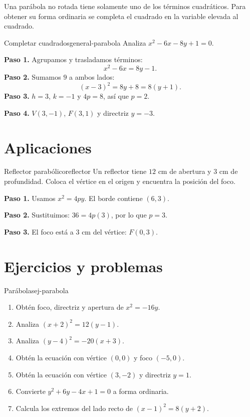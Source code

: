 Una parábola no rotada tiene solamente uno de los términos cuadráticos. Para
obtener su forma ordinaria se completa el cuadrado en la variable elevada al
cuadrado.

\begin{example}{Completar cuadrados}{general-parabola}
Analiza $x^2-6x-8y+1=0$.
\begin{solution}
\textbf{Paso 1.} Agrupamos y trasladamos términos:
\[
x^2-6x=8y-1.
\]
\textbf{Paso 2.} Sumamos $9$ a ambos lados:
\[
(x-3)^2=8y+8=8(y+1).
\]
\textbf{Paso 3.} $h=3$, $k=-1$ y $4p=8$, así que $p=2$.

\textbf{Paso 4.} $V(3,-1)$, $F(3,1)$ y directriz $y=-3$.
\end{solution}
\end{example}

\section{Aplicaciones}

\begin{example}{Reflector parabólico}{reflector}
Un reflector tiene $12$ cm de abertura y $3$ cm de profundidad. Coloca el
vértice en el origen y encuentra la posición del foco.
\begin{solution}
\textbf{Paso 1.} Usamos $x^2=4py$. El borde contiene $(6,3)$.

\textbf{Paso 2.} Sustituimos: $36=4p(3)$, por lo que $p=3$.

\textbf{Paso 3.} El foco está a $3$ cm del vértice: $F(0,3)$.
\end{solution}
\end{example}

\section{Ejercicios y problemas}

\begin{exercise}{Parábolas}{ej-parabola}
\begin{enumerate}
  \item Obtén foco, directriz y apertura de $x^2=-16y$.
  \item Analiza $(x+2)^2=12(y-1)$.
  \item Analiza $(y-4)^2=-20(x+3)$.
  \item Obtén la ecuación con vértice $(0,0)$ y foco $(-5,0)$.
  \item Obtén la ecuación con vértice $(3,-2)$ y directriz $y=1$.
  \item Convierte $y^2+6y-4x+1=0$ a forma ordinaria.
  \item Calcula los extremos del lado recto de $(x-1)^2=8(y+2)$.
\end{enumerate}
\end{exercise}

